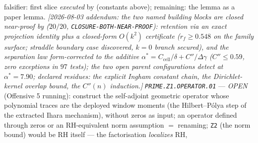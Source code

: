 falsifier: first slice \emph{executed} by
 (constants above); remaining:
the lemma as a paper lemma.  \emph{[2026-08-03 addendum: the two
named building blocks are closed near-proof by
 ($20/20$,
\texttt{CLOSURE-BOTH-NEAR-PROOF}): retention via an exact projection
identity plus a closed-form $O(k^2)$ certificate ($r_f\ge0.548$ on
the family surface; straddle boundary case discovered, $k=0$ branch
secured), and the separation law \emph{form-corrected} to the
additive $\alpha^*=C_{\mathrm{cell}}/\delta+C''/\Delta\gamma$
($C''\le0.59$, zero exceptions in $97$ tests); the two open parent
configurations detect at $\alpha^*=7.90$; declared residues: the
explicit Ingham constant chain, the Dirichlet-kernel overlap bound,
the $C''(n)$ induction.]}  \emph{\texttt{PRIME.Z1.OPERATOR.01}} ---
\emph{OPEN} (Offensive 5 running): construct the self-adjoint
geometric operator whose polynomial traces are the deployed window
moments (the Hilbert--P\'olya step of the extracted Ihara mechanism),
without zeros as input; an operator defined through zeros or an
RH-equivalent norm assumption $=$ renaming; \texttt{Z2} (the norm
bound) would be RH itself --- the factorisation \emph{localizes} RH,

